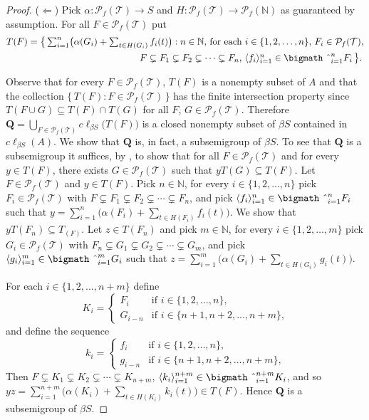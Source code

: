 \documentclass[12pt,showtrims]{memoir}
\theoremstyle{plain}
\theoremstyle{definition}
\newcommand{\la}{\langle}
\newcommand{\ra}{\rangle}
\newcommand{\bbN}{\mathbb{N}}
\newcommand{\calT}{\mathcal{T}}
\newcommand{\Pf}{\mathcal{P}_f}
\newcommand{\bigtimes}{\hbox{\bigmath \char'2}}
\begin{document}
\begin{proof}
  ($\Leftarrow$)
  Pick $\alpha \colon \Pf(\calT) \to S$ and $H \colon \Pf(\calT) \to \Pf(\bbN)$ as guaranteed by assumption.
  For all $F \in \Pf(\calT)$ put
  \begin{align*}
    T(F) &= \bigl\{\, \textstyle \sum_{i=1}^n \bigl( \alpha(G_i) + \sum_{t \in H(G_i)} f_i(t)\bigr) : \mbox{$n \in \bbN$, for each $i \in \{1, 2, \ldots, n\}$, $F_i \in \Pf(\calT)$,}\\
 &\hspace{12em}\mbox{$F \subsetneq F_1 \subsetneq F_2 \subsetneq \cdots \subsetneq F_n$, $\la f_i \ra_{i=1}^n \in \bigtimes_{i=1}^n F_i$} \,\bigr\}.
  \end{align*}

  Observe that for every $F \in \Pf(\calT)$, $T(F)$ is a nonempty subset of $A$ and that the collection $\{\, T(F) : F \in \Pf(\calT) \,\}$ has the finite intersection property since $T(F \cup G) \subseteq T(F) \cap T(G)$ for all $F$, $G \in \Pf(\calT)$.
  Therefore $\mathbf{Q} = \bigcup_{F \in \Pf(\calT)} c\ell_{\beta S}\bigl(T(F)\bigr)$ is a closed nonempty subset of $\beta S$ contained in $c\ell_{\beta S}(A)$. 
  We show that $\mathbf{Q}$ is, in fact, a subsemigroup of $\beta S$. 
  To see that $\mathbf{Q}$ is a subsemigroup it suffices, by \cite[Theorem 4.20]{Hindman:1998fk}, to show that for all $F \in \Pf(\calT)$ and for every $y \in T(F)$, there exists $G \in \Pf(\calT)$ such that $yT(G) \subseteq T(F)$. 
  Let $F \in \Pf(\calT)$ and $y \in T(F)$. 
  Pick $n \in \bbN$, for every $i \in \{1, 2, \ldots, n\}$ pick $F_i \in \Pf(\calT)$ with $F \subsetneq F_1 \subsetneq F_2 \subsetneq \cdots \subsetneq F_n$, and pick $\la f_i \ra_{i=1}^n \in \bigtimes_{i=1}^n F_i$ such that $y = \sum_{i=1}^n \bigl( \alpha(F_i) + \sum_{t \in H(F_i)} f_i(t) \bigr)$.
  We show that $yT(F_n) \subseteq T_(F)$. 
  Let $z \in T(F_n)$ and pick $m \in \bbN$, for every $i \in \{1, 2, \ldots, m\}$ pick $G_i \in \Pf(\calT)$ with $F_n \subsetneq G_1 \subsetneq G_2 \subsetneq \cdots \subsetneq G_m$, and pick $\la g_i \ra_{i=1}^m \in \bigtimes_{i=1}^m G_i$ such that $z = \sum_{i=1}^m \bigl( \alpha(G_i) + \sum_{t \in H(G_i)} g_i(t) \bigr)$.

  For each $i \in \{1, 2, \ldots, n+m\}$ define
  \[
    K_i =
    \begin{cases}
      F_i & \mbox{if $i \in \{1, 2, \ldots, n\}$,} \\
      G_{i-n} & \mbox{if $i \in \{n+1, n+2, \ldots, n+m\}$,}
    \end{cases}
  \]
  and define the sequence
  \[
    k_i =
    \begin{cases}
      f_i & \mbox{if $i \in \{1, 2, \ldots, n\}$,} \\
      g_{i-n} & \mbox{if $i \in \{n+1, n+2, \ldots, n+m\}$,}
    \end{cases}
  \]
  Then $F \subsetneq K_1 \subsetneq K_2 \subsetneq \cdots \subsetneq K_{n+m}$, $\la k_i \ra_{i=1}^{n+m} \in \bigtimes_{i=1}^{n+m} K_i$, and so $yz = \sum_{i=1}^{n+m}\bigl( \alpha(K_i) + \sum_{t \in H(K_i)} k_i(t) \bigr) \in T(F)$.
  Hence $\mathbf{Q}$ is a subsemigroup of $\beta S$.


\end{proof}
\end{document}
